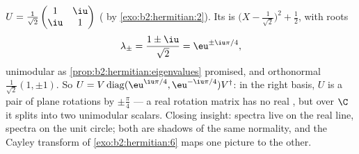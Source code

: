 \begin{example}\label{ex:b2:hermitian:unitary}
$U = \frac{1}{\sqrt2}\begin{pmatrix} 1 & \iu\\ \iu & 1
\end{pmatrix}$ ( by \cref{exo:b2:hermitian:2}). Its
 is $\bigl(X - \frac{1}{\sqrt2}\bigr)^2
+ \frac12$, with roots
\[
\lambda_\pm = \frac{1 \pm \iu}{\sqrt2} = \eu^{\pm\iu\pi/4},
\]
unimodular as \cref{prop:b2:hermitian:eigenvalues} promised, and
orthonormal  $\frac{1}{\sqrt2}(1, \pm1)$. So $U =
V\operatorname{diag}(\eu^{\iu\pi/4},
\eu^{-\iu\pi/4})V^\dagger$: in the right basis, $U$ is a pair of
plane rotations by $\pm\frac\pi4$ --- a real rotation matrix has
no real , but over $\C$ it splits into two
unimodular scalars. Closing insight:  spectra live on
the real line,  spectra on the unit circle; both are
shadows of the same normality, and the Cayley transform of
\cref{exo:b2:hermitian:6} maps one picture to the other.
\end{example}

